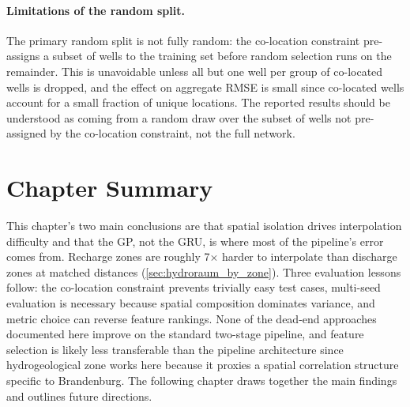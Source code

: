 \paragraph{Limitations of the random split.}
The primary random split is not fully random: the co-location constraint pre-assigns a subset of wells to the training set before random selection runs on the remainder. This is unavoidable unless all but one well per group of co-located wells is dropped, and the effect on aggregate RMSE is small since co-located wells account for a small fraction of unique locations. The reported results should be understood as coming from a random draw over the subset of wells not pre-assigned by the co-location constraint, not the full network.

\section{Chapter Summary}

This chapter's two main conclusions are that spatial isolation drives interpolation difficulty and that the GP, not the GRU, is where most of the pipeline's error comes from. Recharge zones are roughly 7$\times$ harder to interpolate than discharge zones at matched distances (\cref{sec:hydroraum_by_zone}). Three evaluation lessons follow: the co-location constraint prevents trivially easy test cases, multi-seed evaluation is necessary because spatial composition dominates variance, and metric choice can reverse feature rankings. None of the dead-end approaches documented here improve on the standard two-stage pipeline, and feature selection is likely less transferable than the pipeline architecture since hydrogeological zone works here because it proxies a spatial correlation structure specific to Brandenburg. The following chapter draws together the main findings and outlines future directions.
